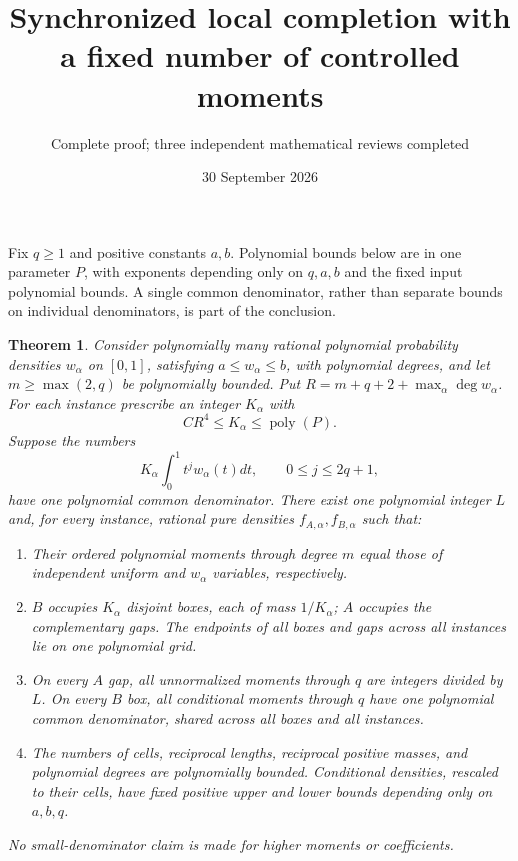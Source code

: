 \documentclass[11pt]{article}
\title{Synchronized local completion with a fixed number of controlled moments}
\author{Complete proof; three independent mathematical reviews completed}
\date{30 September 2026}
\newtheorem{theorem}{Theorem}
\begin{document}
\maketitle
Fix $q\ge1$ and positive constants $a,b$. Polynomial bounds below are
in one parameter $P$, with exponents depending only on $q,a,b$ and the
fixed input polynomial bounds. A single common denominator, rather
than separate bounds on individual denominators, is part of the conclusion.

\begin{theorem}\label{main}
Consider polynomially many rational polynomial probability densities
$w_\alpha$ on $[0,1]$, satisfying $a\le w_\alpha\le b$, with polynomial
degrees, and let $m\ge\max(2,q)$ be polynomially bounded.
Put $R=m+q+2+\max_\alpha\deg w_\alpha$.
For each instance prescribe an integer $K_\alpha$ with
\[
 CR^4\le K_\alpha\le\operatorname{poly}(P).
\]
Suppose the numbers
\begin{equation}\label{inputarithmetic}
 K_\alpha\int_0^1t^j w_\alpha(t)dt,
       \qquad 0\le j\le2q+1,
\end{equation}
have one polynomial common denominator. There exist one polynomial
integer $L$ and, for every instance, rational pure densities
$f_{A,\alpha},f_{B,\alpha}$ such that:
\begin{enumerate}
\item Their ordered polynomial moments through degree $m$ equal those
of independent uniform and $w_\alpha$ variables, respectively.
\item $B$ occupies $K_\alpha$ disjoint boxes, each of mass $1/K_\alpha$;
$A$ occupies the complementary gaps. The endpoints of \emph{all}
boxes and gaps across \emph{all} instances lie on one polynomial grid.
\item On every $A$ gap, all unnormalized moments through $q$ are
integers divided by $L$. On every $B$ box, all conditional moments
through $q$ have one polynomial common denominator, shared across all
boxes and all instances.
\item The numbers of cells, reciprocal lengths, reciprocal positive
masses, and polynomial degrees are polynomially bounded. Conditional
densities, rescaled to their cells, have fixed positive upper and lower
bounds depending only on $a,b,q$.
\end{enumerate}
No small-denominator claim is made for higher moments or coefficients.
\end{theorem}
\end{document}
